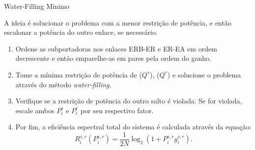 \begin{frame}{Water-Filling Mínimo}
   \begin{bigitem}
      \item A ideia é solucionar o problema com a menor restrição de potência, e então escalonar a potência do outro enlace, se necessário.
      \begin{enumerate}[\noindent i)]
        \item Ordene as subportadoras nos enlaces ERB-ER e ER-EA em ordem decrescente e então emparelhe-as em pares pela ordem do ganho.
        \item Tome a mínima restrição de potência de ($Q^s$), ($Q^r$) e solucione o problema através do método \textit{water-filling}.
        \item Verifique se a restrição de potência do outro salto é violada. Se for violada, escale ambos $P_i^s$ e $P^r_i$ por seu respectivo fator.
        \item Por fim, a eficiência espectral total do sistema é calculada através da equação:
       \begin{equation}
        R_i^{s,r}(P_i^{s,r}) = \frac{1}{2N}\log_2(1 + P_i^{s,r}g_i^{s,r}).
       \end{equation}
      \end{enumerate}
   \end{bigitem}
\end{frame}